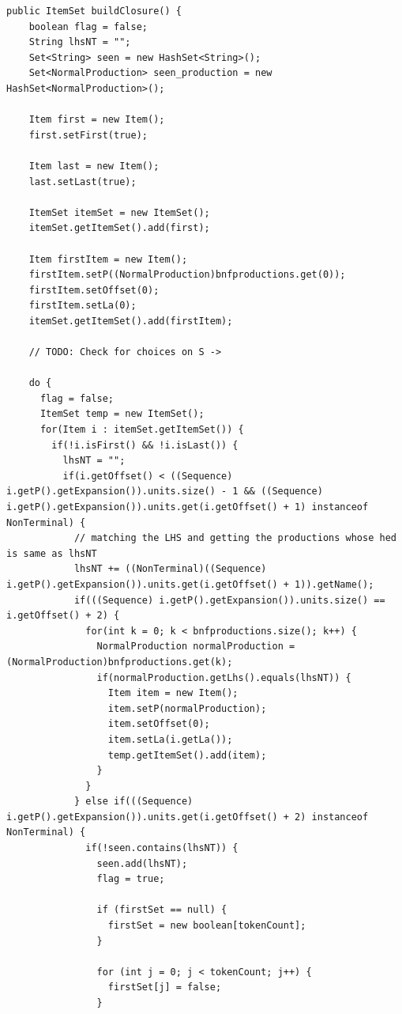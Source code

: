 \documentclass[oneside]{book}
\begin{document}
\begin{lstlisting}
public ItemSet buildClosure() {
    boolean flag = false;
    String lhsNT = "";
    Set<String> seen = new HashSet<String>();
    Set<NormalProduction> seen_production = new HashSet<NormalProduction>();
    
    Item first = new Item();
    first.setFirst(true);
    
    Item last = new Item();
    last.setLast(true);
    
    ItemSet itemSet = new ItemSet();
    itemSet.getItemSet().add(first);
    
    Item firstItem = new Item();
    firstItem.setP((NormalProduction)bnfproductions.get(0));
    firstItem.setOffset(0);
    firstItem.setLa(0);
    itemSet.getItemSet().add(firstItem);
    
    // TODO: Check for choices on S ->
    
    do {
      flag = false;
      ItemSet temp = new ItemSet();
      for(Item i : itemSet.getItemSet()) {
        if(!i.isFirst() && !i.isLast()) {
          lhsNT = "";
          if(i.getOffset() < ((Sequence) i.getP().getExpansion()).units.size() - 1 && ((Sequence) i.getP().getExpansion()).units.get(i.getOffset() + 1) instanceof NonTerminal) {
            // matching the LHS and getting the productions whose hed is same as lhsNT
            lhsNT += ((NonTerminal)((Sequence) i.getP().getExpansion()).units.get(i.getOffset() + 1)).getName();
            if(((Sequence) i.getP().getExpansion()).units.size() == i.getOffset() + 2) {
              for(int k = 0; k < bnfproductions.size(); k++) {
                NormalProduction normalProduction = (NormalProduction)bnfproductions.get(k);
                if(normalProduction.getLhs().equals(lhsNT)) {
                  Item item = new Item();
                  item.setP(normalProduction);
                  item.setOffset(0);
                  item.setLa(i.getLa());
                  temp.getItemSet().add(item);
                }                
              }
            } else if(((Sequence) i.getP().getExpansion()).units.get(i.getOffset() + 2) instanceof NonTerminal) {
              if(!seen.contains(lhsNT)) {
                seen.add(lhsNT);
                flag = true;
              
                if (firstSet == null) {
                  firstSet = new boolean[tokenCount];
                }
              
                for (int j = 0; j < tokenCount; j++) {
                  firstSet[j] = false;
                }
          

\end{lstlisting}
\end{document}
